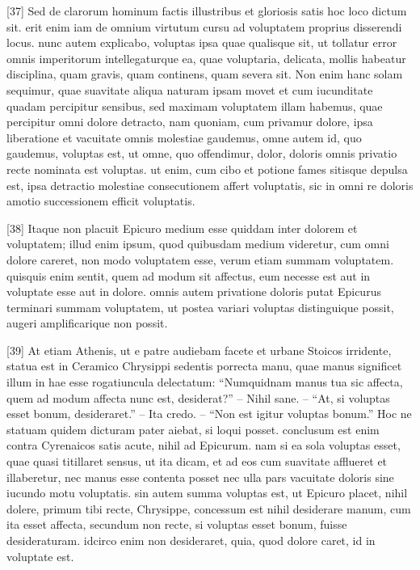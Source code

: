 \documentclass{article}
\begin{document}
[37] Sed de clarorum hominum factis illustribus et gloriosis satis hoc loco dictum sit. erit enim iam de omnium virtutum cursu ad voluptatem proprius disserendi locus. nunc autem explicabo, voluptas ipsa quae qualisque sit, ut tollatur error omnis imperitorum intellegaturque ea, quae voluptaria, delicata, mollis habeatur disciplina, quam gravis, quam continens, quam severa sit. Non enim hanc solam sequimur, quae suavitate aliqua naturam ipsam movet et cum iucunditate quadam percipitur sensibus, sed maximam voluptatem illam habemus, quae percipitur omni dolore detracto, nam quoniam, cum privamur dolore, ipsa liberatione et vacuitate omnis molestiae gaudemus, omne autem id, quo gaudemus, voluptas est, ut omne, quo offendimur, dolor, doloris omnis privatio recte nominata est voluptas. ut enim, cum cibo et potione fames sitisque depulsa est, ipsa detractio molestiae consecutionem affert voluptatis, sic in omni re doloris amotio successionem efficit voluptatis.

[38] Itaque non placuit Epicuro medium esse quiddam inter dolorem et voluptatem; illud enim ipsum, quod quibusdam medium videretur, cum omni dolore careret, non modo voluptatem esse, verum etiam summam voluptatem. quisquis enim sentit, quem ad modum sit affectus, eum necesse est aut in voluptate esse aut in dolore. omnis autem privatione doloris putat Epicurus terminari summam voluptatem, ut postea variari voluptas distinguique possit, augeri amplificarique non possit.

[39] At etiam Athenis, ut e patre audiebam facete et urbane Stoicos irridente, statua est in Ceramico Chrysippi sedentis porrecta manu, quae manus significet illum in hae esse rogatiuncula delectatum: ``Numquidnam manus tua sic affecta, quem ad modum affecta nunc est, desiderat?'' -- Nihil sane. -- ``At, si voluptas esset bonum, desideraret.'' -- Ita credo. -- ``Non est igitur voluptas bonum.'' Hoc ne statuam quidem dicturam pater aiebat, si loqui posset. conclusum est enim contra Cyrenaicos satis acute, nihil ad Epicurum. nam si ea sola voluptas esset, quae quasi titillaret sensus, ut ita dicam, et ad eos cum suavitate afflueret et illaberetur, nec manus esse contenta posset nec ulla pars vacuitate doloris sine iucundo motu voluptatis. sin autem summa voluptas est, ut Epicuro placet, nihil dolere, primum tibi recte, Chrysippe, concessum est nihil desiderare manum, cum ita esset affecta, secundum non recte, si voluptas esset bonum, fuisse desideraturam. idcirco enim non desideraret, quia, quod dolore caret, id in voluptate est.
\end{document}
